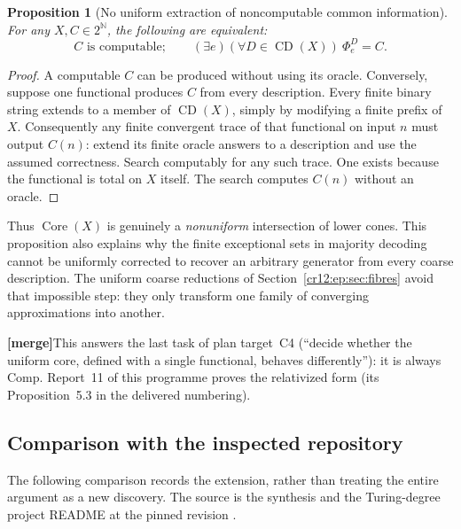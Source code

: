 \documentclass[11pt,letterpaper]{article}
\theoremstyle{plain}
\newtheorem{proposition}[theorem]{Proposition}
\theoremstyle{definition}
\theoremstyle{remark}
\numberwithin{equation}{section}
\newcommand{\N}{\mathbb N}
\newcommand{\Cantor}{2^{\N}}
\newcommand{\Core}{\operatorname{Core}}
\newcommand{\CD}{\operatorname{CD}}
\newcommand{\Comp}{\mathrm{Comp}}
\newcommand{\mergenote}[1]{\par\smallskip\noindent
 {\small\textsf{\textbf{[merge]}}\enspace #1}\par\smallskip}
\begin{document}
\begin{proposition}[No uniform extraction of noncomputable common information]\label{cr12:ep:prop:uniform-core}
For any $X,C\in\Cantor$, the following are equivalent:
\[
 C\text{ is computable};\qquad
 (\exists e)(\forall D\in\CD(X))\ \Phi_e^D=C.
\]
\end{proposition}
\begin{proof}
A computable $C$ can be produced without using its oracle. Conversely, suppose one
functional produces $C$ from every description. Every finite binary string extends
to a member of $\CD(X)$, simply by modifying a finite prefix of $X$. Consequently any
finite convergent trace of that functional on input $n$ must output $C(n)$: extend
its finite oracle answers to a description and use the assumed correctness. Search
computably for any such trace. One exists because the functional is total on $X$
itself. The search computes $C(n)$ without an oracle.
\end{proof}

Thus $\Core(X)$ is genuinely a \emph{nonuniform} intersection of lower cones. This
proposition also explains why the finite exceptional sets in majority decoding
cannot be uniformly corrected to recover an arbitrary generator from every coarse
description. The uniform coarse reductions of Section~\ref{cr12:ep:sec:fibres} avoid
that impossible step: they only transform one family of converging approximations
into another.

\mergenote{This answers the last task of plan target~C4 (``decide whether the uniform
core, defined with a single functional, behaves differently''): it is always
$\Comp$. Report~11 of this programme proves the relativized form (its
Proposition~5.3 in the delivered numbering).}

\subsection{Comparison with the inspected repository}
The following comparison records the extension, rather than treating the entire
argument as a new discovery. The source is the synthesis and the Turing-degree
project README at the pinned revision \cite{Repo,RepoReadme}.
\end{document}
